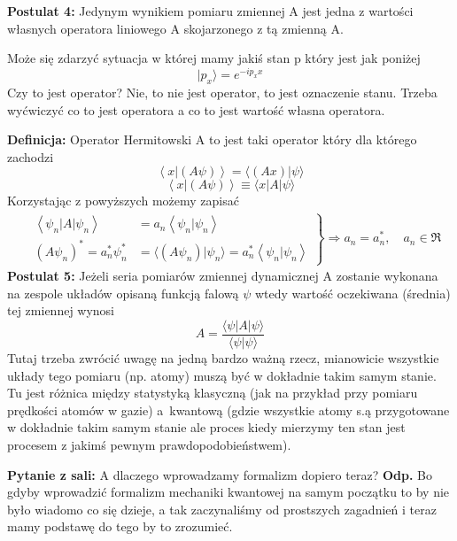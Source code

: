 \textbf{Postulat 4:} Jedynym wynikiem pomiaru zmiennej A jest jedna z wartości własnych operatora liniowego A skojarzonego z tą zmienną A.

Może się zdarzyć sytuacja w której mamy jakiś stan p który jest jak poniżej
\begin{equation*}
	|p_x \rangle = e^{-ip_x x}
\end{equation*}
Czy to jest operator? Nie, to nie jest operator, to jest oznaczenie stanu. Trzeba wyćwiczyć co to jest operatora a co to jest wartość własna operatora.

\textbf{Definicja:} Operator Hermitowski A to jest taki operator który dla którego zachodzi
\begin{equation*}
	\left< x | (A\psi) \right> = \langle (Ax) \vert \psi \rangle
\end{equation*}
\begin{equation*}
	\left< x | (A\psi) \right> \equiv \langle x | A \vert \psi \rangle
\end{equation*}
Korzystając z powyższych możemy zapisać
\begin{align*}
	&\left.
	\begin{aligned}
		\left< \psi_n | A | \psi_n \right> &= a_n \left< \psi_n | \psi_n \right> \\
		(A \psi_n)^* = a_n^* \psi_n^* &= \langle (A \psi_n) | \psi_n \rangle = a_n^* \left< \psi_n | \psi_n \right>
	\end{aligned}
	\right\}
	\Rightarrow a_n = a_n^*, \quad a_n \in \Re
\end{align*}
\textbf{Postulat 5:} Jeżeli seria pomiarów zmiennej dynamicznej A zostanie wykonana na zespole układów opisaną funkcją falową $\psi$ wtedy wartość oczekiwana (średnia) tej zmiennej wynosi
\begin{equation*}
	A = \frac{\langle \psi | A | \psi \rangle}{\langle\psi | \psi\rangle}
\end{equation*}
Tutaj trzeba zwrócić uwagę na jedną bardzo ważną rzecz, mianowicie wszystkie układy tego pomiaru (np. atomy) muszą być w dokładnie takim samym stanie. Tu jest różnica między statystyką klasyczną (jak na przykład przy pomiaru prędkości atomów w gazie) a~kwantową (gdzie wszystkie atomy s.ą przygotowane w dokładnie takim samym stanie ale proces kiedy mierzymy ten stan jest procesem z jakimś pewnym prawdopodobieństwem).

\textbf{Pytanie z sali:} A dlaczego wprowadzamy formalizm dopiero teraz? \textbf{Odp.} Bo gdyby wprowadzić formalizm mechaniki kwantowej na samym początku to by nie było wiadomo co się dzieje, a tak zaczynaliśmy od prostszych zagadnień i teraz mamy podstawę do tego by to zrozumieć.

